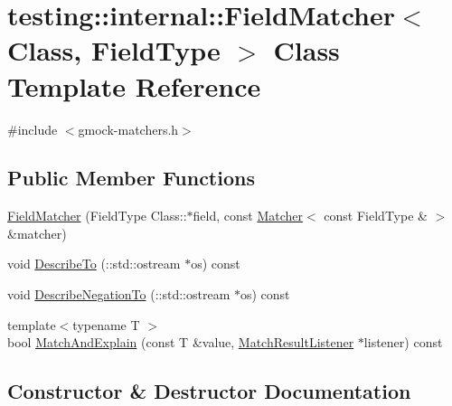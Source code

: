 \hypertarget{classtesting_1_1internal_1_1_field_matcher}{}\section{testing\+:\+:internal\+:\+:Field\+Matcher$<$ Class, Field\+Type $>$ Class Template Reference}
\label{classtesting_1_1internal_1_1_field_matcher}


{\ttfamily \#include $<$gmock-\/matchers.\+h$>$}

\subsection*{Public Member Functions}
\begin{DoxyCompactItemize}
\item 
\hyperlink{classtesting_1_1internal_1_1_field_matcher_adf3435dcc9592b75e474cc90b1424952}{Field\+Matcher} (Field\+Type Class\+::$\ast$field, const \hyperlink{classtesting_1_1_matcher}{Matcher}$<$ const Field\+Type \& $>$ \&matcher)
\item 
void \hyperlink{classtesting_1_1internal_1_1_field_matcher_ac3b02441e2254652579c6e98a25c9b5b}{Describe\+To} (\+::std\+::ostream $\ast$os) const 
\item 
void \hyperlink{classtesting_1_1internal_1_1_field_matcher_aae4069f3686609c9612798e73f28ca05}{Describe\+Negation\+To} (\+::std\+::ostream $\ast$os) const 
\item 
{\footnotesize template$<$typename T $>$ }\\bool \hyperlink{classtesting_1_1internal_1_1_field_matcher_a68fd542e3933c11da824e5e93d3f9858}{Match\+And\+Explain} (const T \&value, \hyperlink{classtesting_1_1_match_result_listener}{Match\+Result\+Listener} $\ast$listener) const 
\end{DoxyCompactItemize}


\subsection{Constructor \& Destructor Documentation}
